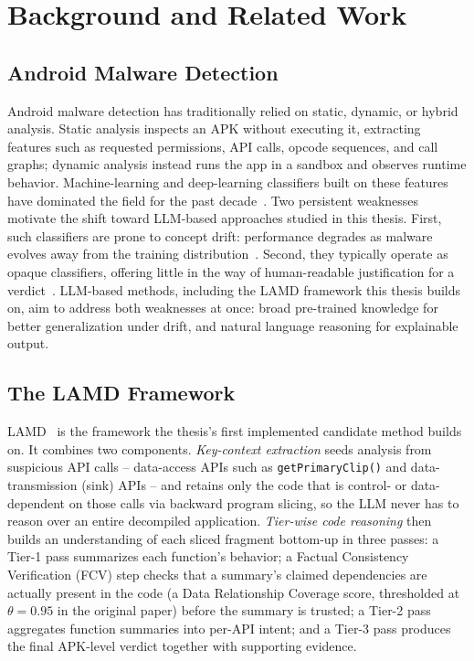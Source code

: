 \chapter{Background and Related Work}
\label{Chapter2}

\section{Android Malware Detection}

Android malware detection has traditionally relied on static, dynamic, or
hybrid analysis. Static analysis inspects an APK without executing it,
extracting features such as requested permissions, API calls, opcode
sequences, and call graphs; dynamic analysis instead runs the app in a
sandbox and observes runtime behavior. Machine-learning and deep-learning
classifiers built on these features have dominated the field for the past
decade~\cite{xu2019droidevolver,kim2019multimodal,cai2021jowmdroid,liu2024unraveling}.
Two persistent weaknesses motivate the shift toward LLM-based approaches
studied in this thesis. First, such classifiers are prone to concept drift:
performance degrades as malware evolves away from the training
distribution~\cite{barbero2022transcending,pendlebury2019tesseract}.
Second, they typically operate as opaque classifiers, offering little in
the way of human-readable justification for a
verdict~\cite{Li2024-wl}. LLM-based methods, including the LAMD framework
this thesis builds on, aim to address both weaknesses at once: broad
pre-trained knowledge for better generalization under drift, and natural
language reasoning for explainable output.

\section{The LAMD Framework}

LAMD~\cite{Qian2025-ua} is the framework the thesis's first implemented
candidate method builds on. It combines two components. \emph{Key-context
extraction} seeds analysis from suspicious API calls -- data-access APIs
such as \texttt{getPrimaryClip()} and data-transmission (sink) APIs -- and
retains only the code that is control- or data-dependent on those calls via
backward program slicing, so the LLM never has to reason over an entire
decompiled application. \emph{Tier-wise code reasoning} then builds an
understanding of each sliced fragment bottom-up in three passes: a Tier-1
pass summarizes each function's behavior; a Factual Consistency
Verification (FCV) step checks that a summary's claimed dependencies are
actually present in the code (a Data Relationship Coverage score,
thresholded at $\theta = 0.95$ in the original paper) before the summary is
trusted; a Tier-2 pass aggregates function summaries into per-API intent;
and a Tier-3 pass produces the final APK-level verdict together with
supporting evidence.


